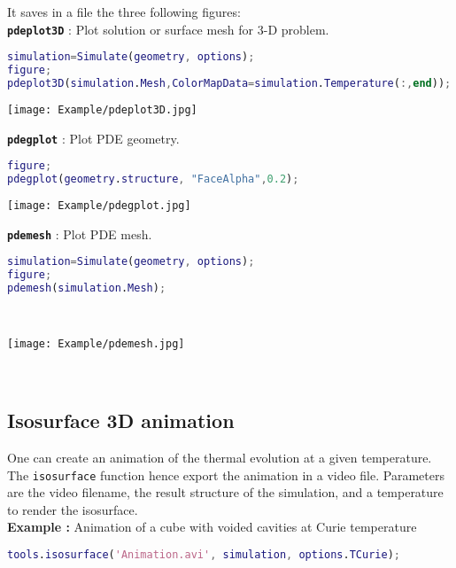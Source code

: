It saves in a file the three following figures:\\

\textbf{\tt pdeplot3D} : Plot solution or surface mesh for 3-D problem.

\begin{lstlisting}[language=Matlab]
simulation=Simulate(geometry, options);
figure;
pdeplot3D(simulation.Mesh,ColorMapData=simulation.Temperature(:,end));
\end{lstlisting}

\begin{center}
\texttt{[image: Example/pdeplot3D.jpg]}
\end{center}


\textbf{\tt pdegplot} : Plot PDE geometry. 

\begin{lstlisting}[language=Matlab]
figure;
pdegplot(geometry.structure, "FaceAlpha",0.2);
\end{lstlisting}

\begin{center}
\texttt{[image: Example/pdegplot.jpg]}
\end{center}


\textbf{\tt pdemesh} : Plot PDE mesh.\\

\begin{lstlisting}[language=Matlab]
simulation=Simulate(geometry, options);
figure;
pdemesh(simulation.Mesh);
\end{lstlisting}
\ 

\begin{center}
\texttt{[image: Example/pdemesh.jpg]}
\end{center}
\ 



\subsection{Isosurface 3D animation}

One can create an animation of the thermal evolution at a given temperature. The {\tt isosurface} function hence export the animation in a video file. Parameters are the video filename, the result structure of the simulation, and a temperature to render the isosurface. \\

\textbf{Example :} Animation of a cube with voided cavities at Curie temperature

\begin{lstlisting}[language=Matlab]
tools.isosurface('Animation.avi', simulation, options.TCurie);
\end{lstlisting}
\ 


